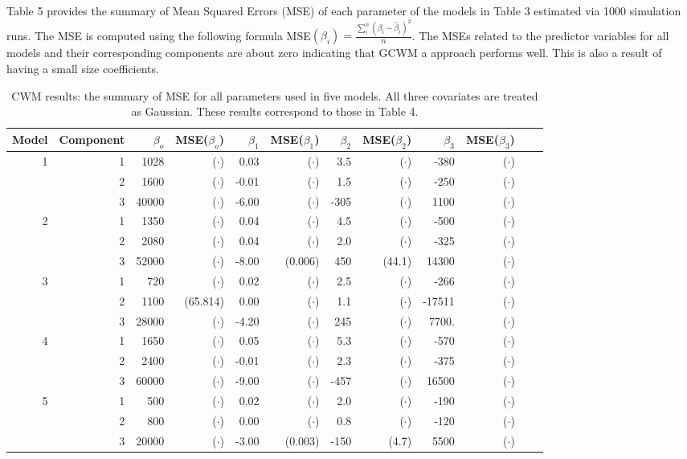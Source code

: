 \documentclass[11pt,letterpaper]{article}
\numberwithin{equation}{section}
\numberwithin{equation}{section}
\numberwithin{equation}{section}
\begin{document}
Table 5 provides the summary of Mean Squared Errors (MSE) of each parameter of the models in Table 3 estimated via 1000 simulation runs. The MSE is computed using the following formula MSE$(\beta_i) = \frac{\sum_i^n (\beta_i - \hat\beta_i ) ^2}{n}$. The MSEs related to the predictor variables for all models and their corresponding components are about zero indicating that  GCWM a approach performs well. This is also a result of having a small size coefficients.


\begin{table}[!htb]
\centering
\caption{CWM results: the summary of MSE for all parameters used in five models. All three covariates are treated as Gaussian. These results correspond to those in Table 4.}
\label{my-label}
\begin{tabular}{rrrrrrrrrrrr}
\hline\hline
Model & Component & $\beta_o$ &  MSE($\beta_o$)   &  $\beta_1$ & MSE($\beta_1$)& $\beta_2$ &MSE($\beta_2$)   & $\beta_3$ &  MSE($\beta_3$)  \\
\hline
1     & 1         & 1028& ($\cdot$)   & 0.03&  ($\cdot$)   & 3.5&  ($\cdot$)    & -380&  ($\cdot$)    \\
      & 2         & 1600&  ($\cdot$)      & -0.01& ($\cdot$)  & 1.5& ($\cdot$)     & -250& ($\cdot$)  \\
      & 3         & 40000& ($\cdot$)     & -6.00& ($\cdot$)  & -305& ($\cdot$)  & 1100& ($\cdot$)    \\
2     & 1         & 1350& ($\cdot$)     & 0.04& ($\cdot$) & 4.5& ($\cdot$)    & -500& ($\cdot$)  \\
      & 2         & 2080&  ($\cdot$)    & 0.04& ($\cdot$)   & 2.0& ($\cdot$)     & -325& ($\cdot$)   \\
      & 3         & 52000&  ($\cdot$)     & -8.00& (0.006)  & 450& (44.1)   & 14300& ($\cdot$)  \\
3     & 1         & 720&  ($\cdot$)     & 0.02& ($\cdot$)   & 2.5& ($\cdot$)    & -266& ($\cdot$)    \\
      & 2         & 1100&  (65.814)     & 0.00& ($\cdot$)   & 1.1& ($\cdot$)     & -17511& ($\cdot$)  \\
      & 3         & 28000& ($\cdot$)   & -4.20& ($\cdot$)  & 245& ($\cdot$)   & 7700.& ($\cdot$)  \\
4     & 1         & 1650& ($\cdot$)    & 0.05& ($\cdot$)  & 5.3& ($\cdot$)    & -570& ($\cdot$)  \\
      & 2         & 2400&  ($\cdot$)     & -0.01& ($\cdot$)  & 2.3& ($\cdot$)    & -375& ($\cdot$)    \\
      & 3         & 60000&  ($\cdot$)     & -9.00& ($\cdot$)  & -457& ($\cdot$)  & 16500& ($\cdot$)   \\
5     & 1         & 500&  ($\cdot$)     & 0.02& ($\cdot$)   & 2.0& ($\cdot$)   & -190& ($\cdot$)  \\
      & 2         & 800&  ($\cdot$)      & 0.00& ($\cdot$)   & 0.8& ($\cdot$)    & -120& ($\cdot$)  \\
      & 3         & 20000&  ($\cdot$)     & -3.00& (0.003)  & -150& (4.7) & 5500& ($\cdot$) \\
      \hline\hline
\end{tabular}
\end{table}
\end{document}
